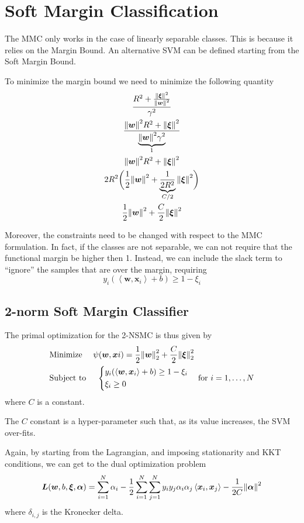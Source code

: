 \documentclass[oneside,onecolumn]{report}
\newcommand{\inp}[2]{\left\langle #1, #2 \right\rangle}
\begin{document}
\section{Soft Margin Classification}
The MMC only works in the case of linearly separable classes.
This is because it relies on the Margin Bound.
An alternative SVM can be defined starting from the Soft Margin Bound.

To minimize the margin bound we need to minimize the following quantity
\begin{gather*}
    \frac{R^2 + \frac{\norm{\bm \xi}^2}{\norm{\bm w}^2}}{\gamma^2} \\
    \frac{\norm{\bm w}^2 R^2 + \norm{\bm \xi}^2}{\underbrace{\norm{\bm w}^2 \gamma^2}_1} \\
    \norm{\bm w}^2 R^2 + \norm{\bm \xi}^2 \\
    2 R^2 \biggl( \frac{1}{2} \norm{\bm w}^2 + \underbrace{\frac{1}{2 R^2}}_{C/2} \norm{\bm \xi}^2 \biggr) \\
    \frac{1}{2} \norm{\bm w}^2 + \frac{C}{2} \norm{\bm \xi}^2
\end{gather*}

Moreover, the constraints need to be changed with respect to the MMC formulation.
In fact, if the classes are not separable, we can not require that the functional margin be higher then 1.
Instead, we can include the slack term to ``ignore'' the samples that are over the margin, requiring
$$ y_i (\inp{\bm w}{\bm x_i} + b) \geq 1 - \xi_i $$


\subsection{2-norm Soft Margin Classifier}
The primal optimization for the 2-NSMC is thus given by
\begin{align*}
    &\text{Minimize   } \quad \psi(\bm w, \bm xi) = \frac{1}{2} \norm{\bm w}_2^2 + \frac{C}{2} \norm{\bm \xi}_2^2 \\
    &\text{Subject to } \quad \begin{dcases}
    y_i (\inp{\bm w}{\bm x_i} + b) \geq 1 - \xi_i \\
    \xi_i \geq 0
\end{dcases} \quad \text{for } i = 1, \dots, N
\end{align*}
where $C$ is a constant.

The $C$ constant is a hyper-parameter such that, as its value increases, the SVM over-fits.

Again, by starting from the Lagrangian, and imposing stationarity and KKT conditions, we can get to the dual optimization problem
$$ \bm L(\bm w, b, \bm \xi, \bm \alpha) = \sum_{i = 1}^N \alpha_i - \frac{1}{2} \sum_{i = 1}^N \sum_{j = 1}^N y_i y_j \alpha_i \alpha_j \inp{\bm x_i}{\bm x_j} - \frac{1}{2 C} \norm{\bm \alpha}^2 $$
where $\delta_{i, j}$ is the Kronecker delta.
\end{document}
